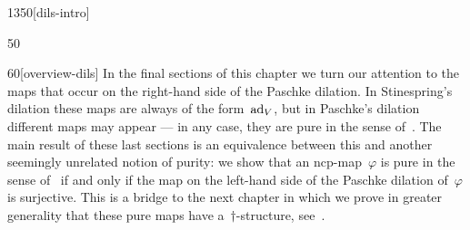 \begin{parsec}{1350}[dils-intro]
\begin{point}{50}
\begin{point}{60}[overview-dils]
In the final sections of this chapter we turn our attention to the maps
    that occur on the right-hand side of the Paschke dilation.
In Stinespring's dilation these maps are always of the form~$\mathrm{ad}_V$,
    but in Paschke's dilation different maps may appear ---
    in any case, they are pure in the sense of~.
The main result of these last sections
    is an equivalence between this and another
    seemingly unrelated notion of purity:
    we show that an ncp-map~$\varphi$ is pure in the sense of~
    if and only if the map on the left-hand side of
    the Paschke dilation of~$\varphi$ is surjective.
This is a bridge to the next chapter
    in which we prove in greater generality
    that these pure maps have a~$\dagger$-structure,
    see~.
\end{point}
\end{point}
\end{parsec}

